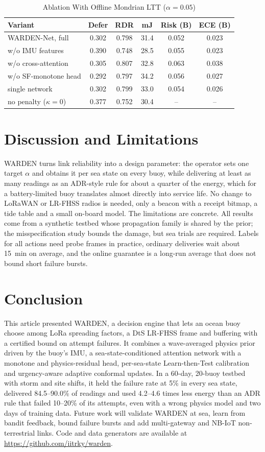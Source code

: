 \documentclass[journal]{IEEEtran}\def\WARDENieee{1}%
\begin{document}
\begin{table}[!t]
\caption{Ablation With Offline Mondrian LTT ($\alpha=0.05$)}\label{tab:abl}
\centering\scriptsize\setlength{\tabcolsep}{3pt}
\begin{tabular}{@{}lccccc@{}}
\toprule
Variant & Defer & RDR & mJ & Risk (B) & ECE (B)\\\midrule
WARDEN-Net, full & 0.302 & 0.798 & 31.4 & 0.052 & 0.023\\
w/o IMU features & 0.390 & 0.748 & 28.5 & 0.055 & 0.023\\
w/o cross-attention & 0.305 & 0.807 & 32.8 & 0.063 & 0.038\\
w/o SF-monotone head & 0.292 & 0.797 & 34.2 & 0.056 & 0.027\\
single network & 0.302 & 0.799 & 33.0 & 0.054 & 0.026\\
no penalty ($\kappa=0$) & 0.377 & 0.752 & 30.4 & -- & --\\
\bottomrule
\end{tabular}
\end{table}

\section{Discussion and Limitations}
WARDEN turns link reliability into a design parameter: the operator sets one target $\alpha$ and obtains it per sea state on every buoy, while delivering at least as many readings as an ADR-style rule for about a quarter of the energy, which for a battery-limited buoy translates almost directly into service life. No change to LoRaWAN or LR-FHSS radios is needed, only a beacon with a receipt bitmap, a tide table and a small on-board model. The limitations are concrete. All results come from a synthetic testbed whose propagation family is shared by the prior; the misspecification study bounds the damage, but sea trials are required. Labels for all actions need probe frames in practice, ordinary deliveries wait about 15~min on average, and the online guarantee is a long-run average that does not bound short failure bursts.

\section{Conclusion}
This article presented WARDEN, a decision engine that lets an ocean buoy choose among LoRa spreading factors, a DtS LR-FHSS frame and buffering with a certified bound on attempt failures. It combines a wave-averaged physics prior driven by the buoy's IMU, a sea-state-conditioned attention network with a monotone and physics-residual head, per-sea-state Learn-then-Test calibration and urgency-aware adaptive conformal updates. In a 60-day, 20-buoy testbed with storm and site shifts, it held the failure rate at 5\% in every sea state, delivered 84.5--90.0\% of readings and used 4.2--4.6 times less energy than an ADR rule that failed 10--20\% of its attempts, even with a wrong physics model and two days of training data. Future work will validate WARDEN at sea, learn from bandit feedback, bound failure bursts and add multi-gateway and NB-IoT non-terrestrial links. Code and data generators are available at \url{https://github.com/iitrky/warden}.


\end{document}
